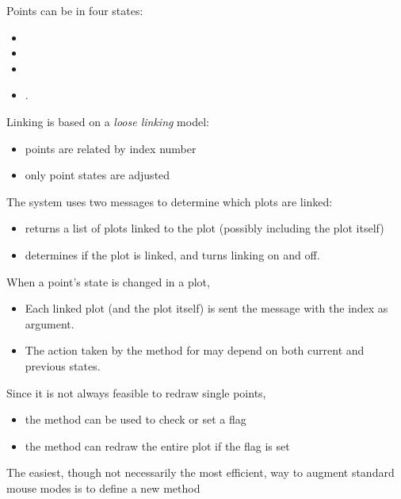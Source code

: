 \begin{slide}{}
Points can be in four states:
\begin{itemize}
\item[] 
\item[] 
\item[] 
\item[] .
\end{itemize}
Linking is based on a {\em loose linking}\/ model:
\begin{itemize}
\item points are related by index number
\item only point states are adjusted
\end{itemize}
The system uses two messages to determine which plots are linked:
\begin{itemize}
\item
{} returns a list of plots linked to the plot (possibly
including the plot itself)
\item {} determines if the plot is linked, and
turns linking on and off.
\end{itemize}
\end{slide}

\begin{slide}{}
When a point's state is changed in a plot,
\begin{itemize}
\item
Each linked plot (and the plot itself) is sent the
 message with the index as argument.
\item
The action taken by the method for  may
depend on both current and previous states.
\end{itemize}
Since it is not always feasible to redraw single points,
\begin{itemize}
\item
the  method can be used to check or set a flag
\item
the  method can redraw the entire plot if the
flag is set
\end{itemize}
The easiest, though not necessarily the most efficient, way to augment
standard mouse modes is to define a new  method
\end{slide}

